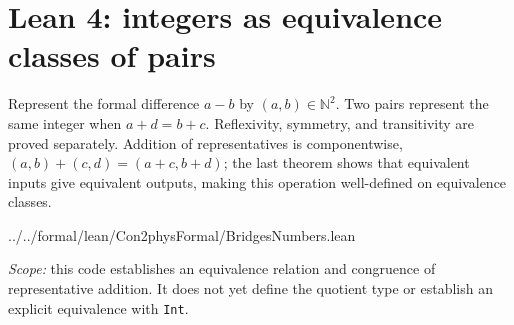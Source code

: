 \section{Lean 4: integers as equivalence classes of pairs}
\label{sec:lean-bridge-10}
Represent the formal difference $a-b$ by $(a,b)\in\mathbb N^2$.
Two pairs represent the same integer when $a+d=b+c$.
Reflexivity, symmetry, and transitivity are proved separately.
Addition of representatives is componentwise,
$(a,b)+(c,d)=(a+c,b+d)$; the last theorem shows that
equivalent inputs give equivalent outputs, making this operation
well-defined on equivalence classes.


{../../formal/lean/Con2physFormal/BridgesNumbers.lean}

\noindent\textit{Scope:} this code establishes an equivalence relation
and congruence of representative addition. It does not yet define
the quotient type or establish an explicit equivalence with \texttt{Int}.

